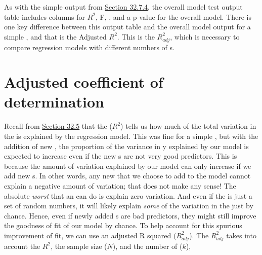 \documentclass[
  openany]{krantz}
\begin{document}
As with the simple  output from \protect\hyperlink{simple-regression-output}{Section 32.7.4}, the overall model test output table includes columns for \(R^{2}\), F, , and a p-value for the overall model.
There is one key difference between this output table and the overall model output for a simple , and that is the Adjusted \(R^{2}\).
This is the  \(R^{2}_{adj}\), which is necessary to compare regression models with different numbers of s.

\hypertarget{adjusted-coefficient-of-determination}{%
\section{Adjusted coefficient of determination}\label{adjusted-coefficient-of-determination}}

Recall from \protect\hyperlink{coefficient-of-determination}{Section 32.5} that the  (\(R^{2}\)) tells us how much of the total variation in the  is explained by the regression model.
This was fine for a simple , but with the addition of new , the proportion of the variance in y explained by our model is expected to increase even if the new s are not very good predictors.
This is because the amount of variation explained by our model can only increase if we add new s.
In other words, any new  that we choose to add to the model cannot explain a negative amount of variation; that does not make any sense!
The absolute \emph{worst} that an  can do is explain zero variation.
And even if the  is just a set of random numbers, it will likely explain \emph{some} of the variation in the  just by chance.
Hence, even if newly added s are bad predictors, they might still improve the goodness of fit of our model by chance.
To help account for this spurious improvement of fit, we can use an adjusted R squared (\(R^{2}_{adj}\)).
The \(R^{2}_{adj}\) takes into account the \(R^{2}\), the sample size (\(N\)), and the number of  (\(k\)),
\end{document}

